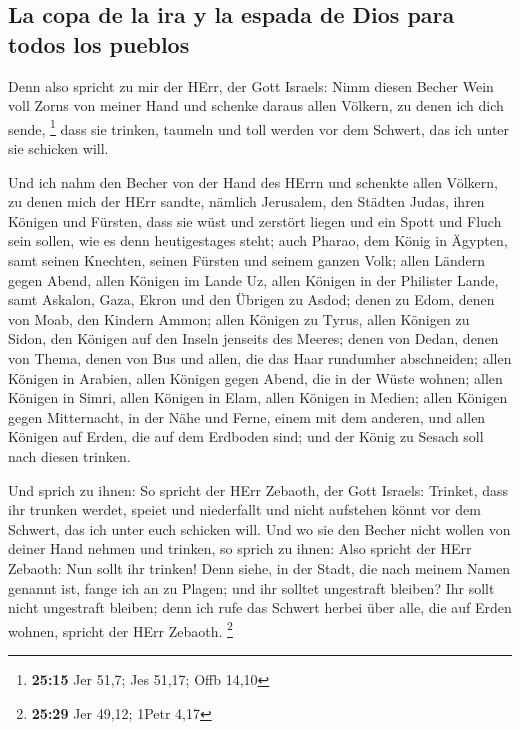 \hypertarget{la-copa-de-la-ira-y-la-espada-de-dios-para-todos-los-pueblos}{%
\subsection{La copa de la ira y la espada de Dios para todos los
pueblos}\label{la-copa-de-la-ira-y-la-espada-de-dios-para-todos-los-pueblos}}

 Denn also spricht zu mir der HErr, der Gott Israels:
Nimm diesen Becher Wein voll Zorns von meiner Hand und schenke daraus
allen Völkern, zu denen ich dich sende, \footnote{\textbf{25:15} Jer
  51,7; Jes 51,17; Offb 14,10}  dass sie trinken, taumeln
und toll werden vor dem Schwert, das ich unter sie schicken will.

 Und ich nahm den Becher von der Hand des HErrn und
schenkte allen Völkern, zu denen mich der HErr sandte, 
nämlich Jerusalem, den Städten Judas, ihren Königen und Fürsten, dass
sie wüst und zerstört liegen und ein Spott und Fluch sein sollen, wie es
denn heutigestages steht;  auch Pharao, dem König in
Ägypten, samt seinen Knechten, seinen Fürsten und seinem ganzen Volk;
 allen Ländern gegen Abend, allen Königen im Lande Uz,
allen Königen in der Philister Lande, samt Askalon, Gaza, Ekron und den
Übrigen zu Asdod;  denen zu Edom, denen von Moab, den
Kindern Ammon;  allen Königen zu Tyrus, allen Königen zu
Sidon, den Königen auf den Inseln jenseits des Meeres; 
denen von Dedan, denen von Thema, denen von Bus und allen, die das Haar
rundumher abschneiden;  allen Königen in Arabien, allen
Königen gegen Abend, die in der Wüste wohnen;  allen
Königen in Simri, allen Königen in Elam, allen Königen in Medien;
 allen Königen gegen Mitternacht, in der Nähe und Ferne,
einem mit dem anderen, und allen Königen auf Erden, die auf dem Erdboden
sind; und der König zu Sesach soll nach diesen trinken.

 Und sprich zu ihnen: So spricht der HErr Zebaoth, der
Gott Israels: Trinket, dass ihr trunken werdet, speiet und niederfallt
und nicht aufstehen könnt vor dem Schwert, das ich unter euch schicken
will.  Und wo sie den Becher nicht wollen von deiner Hand
nehmen und trinken, so sprich zu ihnen: Also spricht der HErr Zebaoth:
Nun sollt ihr trinken!  Denn siehe, in der Stadt, die
nach meinem Namen genannt ist, fange ich an zu Plagen; und ihr solltet
ungestraft bleiben? Ihr sollt nicht ungestraft bleiben; denn ich rufe
das Schwert herbei über alle, die auf Erden wohnen, spricht der HErr
Zebaoth. \footnote{\textbf{25:29} Jer 49,12; 1Petr 4,17}

